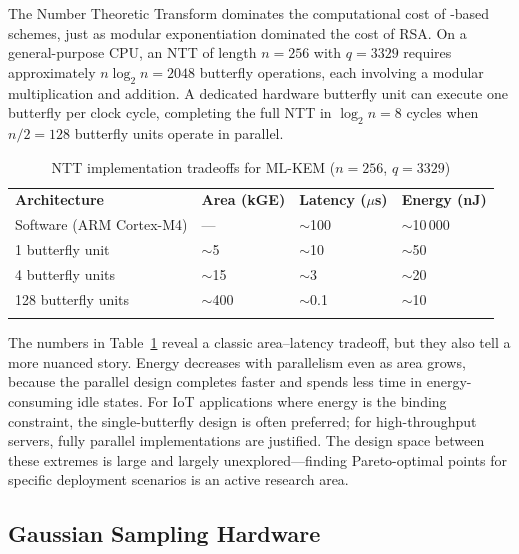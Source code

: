 The Number Theoretic Transform dominates the computational cost of \mlwe{}-based schemes, just as modular exponentiation dominated the cost of RSA.  On a general-purpose CPU, an NTT of length $n = 256$ with $q = 3329$ requires approximately $n \log_2 n = 2048$ butterfly operations, each involving a modular multiplication and addition.  A dedicated hardware butterfly unit can execute one butterfly per clock cycle, completing the full NTT in $\log_2 n = 8$ cycles when $n/2 = 128$ butterfly units operate in parallel.

\begin{table}[t]
\caption{NTT implementation tradeoffs for ML-KEM ($n=256$, $q=3329$)}
\label{tab:ntt-hw}
\begin{tabular}{p{3cm}p{2.5cm}p{2.5cm}p{2.5cm}}
\hline\noalign{\smallskip}
\textbf{Architecture} & \textbf{Area (kGE)} & \textbf{Latency ($\mu$s)} & \textbf{Energy (nJ)} \\
\noalign{\smallskip}\svhline\noalign{\smallskip}
Software (ARM Cortex-M4) & --- & $\sim$100 & $\sim$10\,000 \\
1 butterfly unit & $\sim$5 & $\sim$10 & $\sim$50 \\
4 butterfly units & $\sim$15 & $\sim$3 & $\sim$20 \\
128 butterfly units & $\sim$400 & $\sim$0.1 & $\sim$10 \\
\noalign{\smallskip}\hline
\end{tabular}
\end{table}

The numbers in Table~\ref{tab:ntt-hw} reveal a classic area--latency tradeoff, but they also tell a more nuanced story.  Energy decreases with parallelism even as area grows, because the parallel design completes faster and spends less time in energy-consuming idle states.  For IoT applications where energy is the binding constraint, the single-butterfly design is often preferred; for high-throughput servers, fully parallel implementations are justified.  The design space between these extremes is large and largely unexplored---finding Pareto-optimal points for specific deployment scenarios is an active research area.

\subsection{Gaussian Sampling Hardware}
\label{subsec:gaussian-hw}

